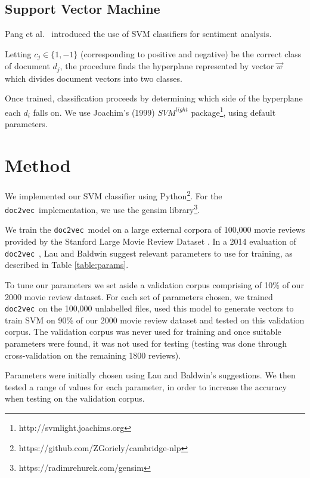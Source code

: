 \documentclass[12pt]{article}
\newcommand{\docvec}{\texttt{doc2vec}}
\begin{document}
\begin{multicols}{2}
\vspace{-3mm}

\subsection{Support Vector Machine}

Pang et al.~\cite{pang2002thumbs} introduced the use of SVM classifiers for sentiment analysis.

Letting $c_{j} \in \{1, -1\}$ (corresponding to positive and negative) be the correct class of document $d_{j}$, the procedure finds the hyperplane represented by vector $\vec{w}$ which divides document vectors into  two classes.

Once trained, classification proceeds by determining which side of the hyperplane each $d_{i}$ falls on. We use Joachim's (1999) $SVM^{light}$ package\footnote{http://svmlight.joachims.org}, using default parameters.

\section{Method}

We implemented our SVM classifier using Python\footnote{https://github.com/ZGoriely/cambridge-nlp}. For the \docvec~implementation, we use the gensim library\footnote{https://radimrehurek.com/gensim}.

We train the \docvec~model on a large external corpora of 100,000 movie reviews provided by the Stanford Large Movie Review Dataset \cite{maas-EtAl:2011:ACL-HLT2011}. In a 2014 evaluation of \docvec~, Lau and Baldwin \cite{lau2016empirical} suggest relevant parameters to use for training, as described in Table \ref{table:params}. 

To tune our parameters we set aside a validation corpus comprising of 10\% of our 2000 movie review dataset. For each set of parameters chosen, we trained \docvec~on the 100,000 unlabelled files, used this model to generate vectors to train SVM on 90\% of our 2000 movie review dataset and tested on this validation corpus. The validation corpus was never used for training and once suitable parameters were found, it was not used for testing (testing was done through cross-validation on the remaining 1800 reviews).

Parameters were initially chosen using Lau and Baldwin's suggestions. We then tested a range of values for each parameter, in order to increase the accuracy when testing on the validation corpus. 


\end{multicols}
\end{document}

